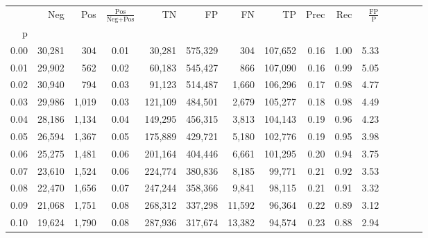 \begin{tabular}{rrrcrrrrrrrrrrr}
\toprule
{} &     Neg &    Pos & $\frac{\text{Pos}}{\text{Neg}+\text{Pos}}$ &       TN &       FP &       FN &       TP &  Prec &   Rec & $\frac{\text{FP}}{\text{P}}$ \\
p    &         &        &                                            &          &          &          &          &       &       &                              \\
\midrule
0.00 &  30,281 &    304 &                                       0.01 &   30,281 &  575,329 &      304 &  107,652 &  0.16 &  1.00 &                         5.33 \\
0.01 &  29,902 &    562 &                                       0.02 &   60,183 &  545,427 &      866 &  107,090 &  0.16 &  0.99 &                         5.05 \\
0.02 &  30,940 &    794 &                                       0.03 &   91,123 &  514,487 &    1,660 &  106,296 &  0.17 &  0.98 &                         4.77 \\
0.03 &  29,986 &  1,019 &                                       0.03 &  121,109 &  484,501 &    2,679 &  105,277 &  0.18 &  0.98 &                         4.49 \\
0.04 &  28,186 &  1,134 &                                       0.04 &  149,295 &  456,315 &    3,813 &  104,143 &  0.19 &  0.96 &                         4.23 \\
0.05 &  26,594 &  1,367 &                                       0.05 &  175,889 &  429,721 &    5,180 &  102,776 &  0.19 &  0.95 &                         3.98 \\
0.06 &  25,275 &  1,481 &                                       0.06 &  201,164 &  404,446 &    6,661 &  101,295 &  0.20 &  0.94 &                         3.75 \\
0.07 &  23,610 &  1,524 &                                       0.06 &  224,774 &  380,836 &    8,185 &   99,771 &  0.21 &  0.92 &                         3.53 \\
0.08 &  22,470 &  1,656 &                                       0.07 &  247,244 &  358,366 &    9,841 &   98,115 &  0.21 &  0.91 &                         3.32 \\
0.09 &  21,068 &  1,751 &                                       0.08 &  268,312 &  337,298 &   11,592 &   96,364 &  0.22 &  0.89 &                         3.12 \\
0.10 &  19,624 &  1,790 &                                       0.08 &  287,936 &  317,674 &   13,382 &   94,574 &  0.23 &  0.88 &                         2.94 \\

\end{tabular}
